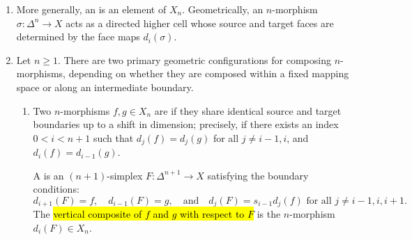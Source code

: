 \begin{definition}
\begin{enumerate}


        In particular, compositions of morphisms exist whenever $X$ is a  and are unique whenever $X$ satisfies the conditions of , i.e. when $X$ is isomorphic to the  of a small category.
        Furthermore, if $X$ is a quasi-category, any two compositions $F, F': \Delta^2 \to X$ of the same morphisms $f$ and $g$ yield composites $d_1(F)$ and $d_1(F')$ that are homotopic in the sense of , meaning they define the same unique morphism in the  $\mathrm{h}X$.

        \item More generally, an  is an element of $X_n$. Geometrically, an $n$-morphism $\sigma: \Delta^n \to X$ acts as a directed higher cell whose source and target faces are determined by the face maps $d_i(\sigma)$. 

        \item Let $n \ge 1$. There are two primary geometric configurations for composing $n$-morphisms, depending on whether they are composed within a fixed mapping space or along an intermediate boundary.

        \begin{enumerate}
            \item Two $n$-morphisms $f, g \in X_n$ are  if they share identical source and target boundaries up to a shift in dimension; precisely, if there exists an index $0 < i < n+1$ such that $d_j(f) = d_j(g)$ for all $j \neq i-1, i$, and $d_i(f) = d_{i-1}(g)$. 
            
            A  is an $(n+1)$-simplex $F: \Delta^{n+1} \to X$ satisfying the boundary conditions:
            $$d_{i+1}(F) = f, \quad d_{i-1}(F) = g, \quad \text{and} \quad d_j(F) = s_{i-1}d_j(f) \text{ for all } j \neq i-1, i, i+1.$$
            The \hl{vertical composite of $f$ and $g$ with respect to $F$} is the $n$-morphism $d_i(F) \in X_n$.


\end{enumerate}
\end{enumerate}
\end{definition}
